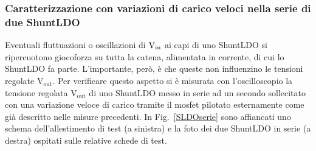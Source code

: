 
\subsubsection{Caratterizzazione con variazioni di carico veloci nella serie di due ShuntLDO}

Eventuali fluttuazioni o oscillazioni di $\mathrm{V_{in}}$ ai capi di uno ShuntLDO si ripercuotono giocoforza su tutta la catena, alimentata in corrente, di cui lo ShuntLDO fa parte. L'importante, per\`o, \`e che queste non influenzino le tensioni regolate $\mathrm{V_{out}}$.
Per verificare questo aspetto si è misurata con l'oscilloscopio la tensione regolata $\mathrm{V_{out}}$ di uno ShuntLDO messo in serie ad un secondo sollecitato con una variazione veloce di carico tramite il mosfet pilotato esternamente come già descritto nelle misure precedenti.
In Fig.~\ref{SLDOserie} sono affiancati uno schema dell'allestimento di test (a sinistra) e la foto dei due ShuntLDO in serie (a destra) ospitati sulle relative schede di test. 

